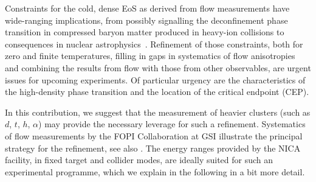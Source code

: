 \documentclass[epj]{svjour}
\begin{document}
Constraints for the cold, dense EoS as derived from flow measurements
\cite{Danielewicz:2002pu} have wide-ranging implications, from possibly 
signalling the deconfinement phase transition in compressed baryon matter produced
in heavy-ion collisions to consequences in nuclear 
astrophysics~\cite{Klahn:2006ir,Blaschke:2008cu,Klahn:2011au}.
Refinement of those constraints, both for zero and finite temperatures, filling
in gaps in systematics of flow anisotropies and combining the results from flow
with those from other observables, are urgent issues for upcoming experiments. 
Of particular urgency are the characteristics of the high-density phase 
transition and the location of the critical endpoint (CEP).

In this contribution, we suggest that the measurement of heavier
clusters (such as $d$, $t$, $h$, $\alpha$) may provide the necessary leverage 
for such a refinement.
Systematics of flow measurements by the FOPI Collaboration at GSI \cite{Rami:1998bf}
illustrate the principal strategy for the refinement, see also \cite{FOPI:2011aa}.
The energy ranges provided by the NICA facility, in fixed target and collider 
modes, are ideally suited for such an experimental programme, which we explain 
in the following in a bit more detail.
\end{document}
